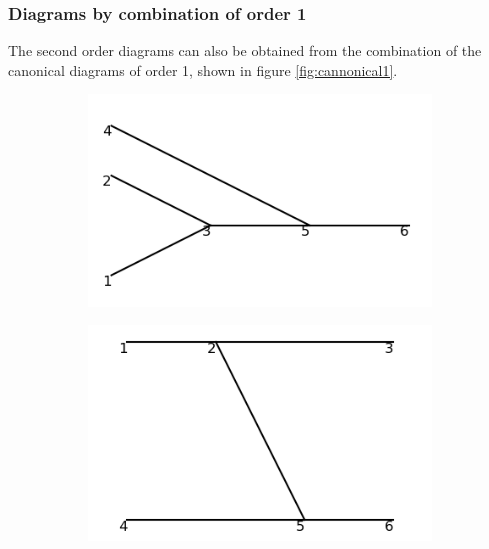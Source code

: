 \documentclass[11pt,a4paper,twoside,pdf]{article}
\numberwithin{equation}{section}
\begin{document}
\subsubsection{Diagrams by combination of order 1}
The second order diagrams can also be obtained from the combination of the canonical
diagrams of order 1, shown in figure \ref{fig:cannonical1}.

\begin{figure}[h!]
    \centering
    \begin{subfigure}[t]{0.24\textwidth}
        \centering
        \includegraphics[width=\textwidth]{plots/order2/from_order1/1.png}
        \caption{ }
        \label{fig:order2_from_order1/1}
    \end{subfigure}%
    \hfill
    \begin{subfigure}[t]{0.24\textwidth}
        \centering
        \includegraphics[width=\textwidth]{plots/order2/from_order1/2.png}
        \caption{ }
        \label{fig:order2_from_order1/2}
    \end{subfigure}

\end{figure}
\end{document}
